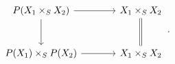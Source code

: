 \[
\begin{tikzcd}[column sep=large,row sep=large]
  P(X_1\times_S X_2)
    \arrow[r]
    \arrow[d]
  &
  X_1\times_S X_2
    \arrow[d,equal]
  \\
  P(X_1)\times_S P(X_2)
    \arrow[r]
  &
  X_1\times_S X_2
\end{tikzcd}
\,.
\]
